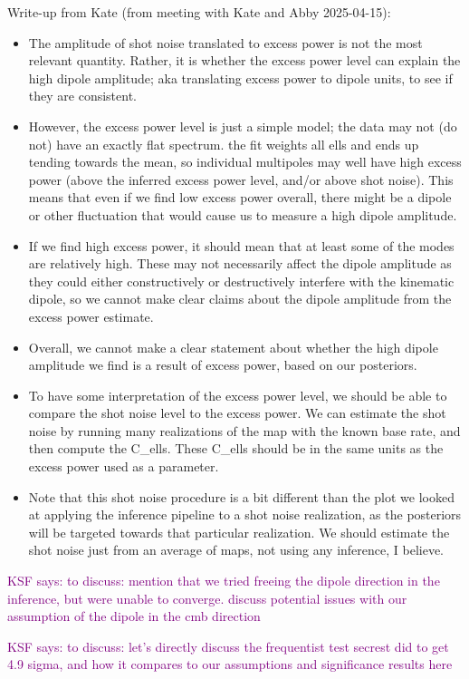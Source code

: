 \documentclass[modern]{aastex631}
\newcommand{\ksf}[1]{\textcolor{purple}{KSF says: #1}}
\begin{document}
Write-up from Kate (from meeting with Kate and Abby 2025-04-15):
\begin{itemize}
    \item The amplitude of shot noise translated to excess power is not the most relevant quantity. Rather, it is whether the excess power level can explain the high dipole amplitude; aka translating excess power to dipole units, to see if they are consistent.
    \item However, the excess power level is just a simple model; the data may not (do not) have an exactly flat spectrum. the fit weights all ells and ends up tending towards the mean, so individual multipoles may well have high excess power (above the inferred excess power level, and/or above shot noise). This means that even if we find low excess power overall, there might be a dipole or other fluctuation that would cause us to measure a high dipole amplitude.
    \item If we find high excess power, it should mean that at least some of the modes are relatively high. These may not necessarily affect the dipole amplitude as they could either constructively or destructively interfere with the kinematic dipole, so we cannot make clear claims about the dipole amplitude from the excess power estimate.
    \item Overall, we cannot make a clear statement about whether the high dipole amplitude we find is a result of excess power, based on our posteriors.
    \item To have some interpretation of the excess power level, we should be able to compare the shot noise level to the excess power. We can estimate the shot noise by running many realizations of the map with the known base rate, and then compute the C\_ells. These C\_ells should be in the same units as the excess power used as a parameter.
    \item Note that this shot noise procedure is a bit different than the plot we looked at applying the inference pipeline to a shot noise realization, as the posteriors will be targeted towards that particular realization. We should estimate the shot noise just from an average of maps, not using any inference, I believe.
\end{itemize}

\ksf{to discuss: mention that we tried freeing the dipole direction in the inference, but were unable to converge. discuss potential issues with our assumption of the dipole in the cmb direction}

\ksf{to discuss: let's directly discuss the frequentist test secrest did to get 4.9 sigma, and how it compares to our assumptions and significance results here}
\end{document}
